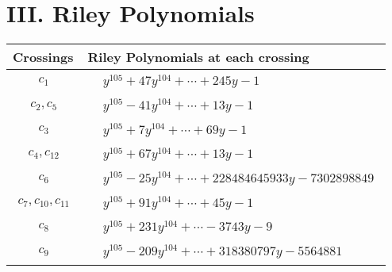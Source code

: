 \documentclass[1p]{elsarticle_modified}
\theoremstyle{definition}
\begin{document}
\centering \section*{ III. Riley Polynomials}
\begin{tabular}{m{50pt}|m{274pt}}
Crossings & \hspace{64pt}Riley Polynomials at each crossing \\
\hline $$\begin{aligned}c_{1}\end{aligned}$$&$\begin{aligned}
&y^{105}+47 y^{104}+\cdots+245 y-1
\end{aligned}$\\
\hline $$\begin{aligned}c_{2},c_{5}\end{aligned}$$&$\begin{aligned}
&y^{105}-41 y^{104}+\cdots+13 y-1
\end{aligned}$\\
\hline $$\begin{aligned}c_{3}\end{aligned}$$&$\begin{aligned}
&y^{105}+7 y^{104}+\cdots+69 y-1
\end{aligned}$\\
\hline $$\begin{aligned}c_{4},c_{12}\end{aligned}$$&$\begin{aligned}
&y^{105}+67 y^{104}+\cdots+13 y-1
\end{aligned}$\\
\hline $$\begin{aligned}c_{6}\end{aligned}$$&$\begin{aligned}
&y^{105}-25 y^{104}+\cdots+228484645933 y-7302898849
\end{aligned}$\\
\hline $$\begin{aligned}c_{7},c_{10},c_{11}\end{aligned}$$&$\begin{aligned}
&y^{105}+91 y^{104}+\cdots+45 y-1
\end{aligned}$\\
\hline $$\begin{aligned}c_{8}\end{aligned}$$&$\begin{aligned}
&y^{105}+231 y^{104}+\cdots-3743 y-9
\end{aligned}$\\
\hline $$\begin{aligned}c_{9}\end{aligned}$$&$\begin{aligned}
&y^{105}-209 y^{104}+\cdots+318380797 y-5564881
\end{aligned}$\\
\hline
\end{tabular}
\vskip 2pc
\end{document}
